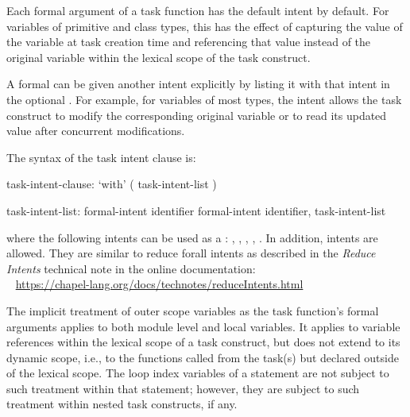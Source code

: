 Each formal argument of a task function has the default intent by default.
For variables of primitive and class types, this has the effect
of capturing the value of the variable at task creation time
and referencing that value instead of the original variable
within the lexical scope of the task construct.

A formal can be given another intent explicitly by listing it
with that intent in the optional .
For example, for variables of most types, the  intent allows
the task construct to modify the corresponding original variable
or to read its updated value after concurrent modifications.

The syntax of the task intent clause is:

\begin{syntax}
task-intent-clause:
  `with' ( task-intent-list )

task-intent-list:
  formal-intent identifier
  formal-intent identifier, task-intent-list
\end{syntax}

where the following intents can be used as a :
, , , , .
In addition,  intents are allowed.
They are similar to reduce forall intents 
as described in the \emph{Reduce Intents} technical note
in the online documentation:
\\ %
\mbox{$$ $$ $$} %
\url{https://chapel-lang.org/docs/technotes/reduceIntents.html}


The implicit treatment of outer scope variables as the task function's
formal arguments applies to both module level and local variables.
It applies to variable references within the lexical scope
of a task construct, but does not extend to its dynamic scope, i.e.,
to the functions called from the task(s) but declared outside of
the lexical scope.
The loop index variables of a  statement are not
subject to such treatment within that statement; however, they are
subject to such treatment within nested task constructs, if any.


